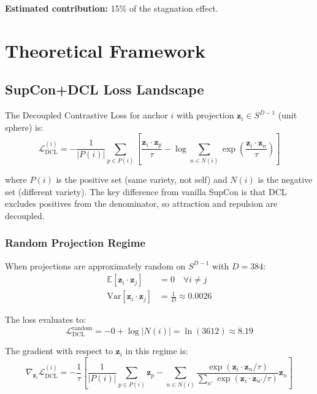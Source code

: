 \documentclass[11pt,a4paper]{article}
\newcommand{\loss}{\mathcal{L}}
\newcommand{\expect}{\mathbb{E}}
\newcommand{\dcl}{\text{DCL}}
\begin{document}
\medskip
\noindent\textbf{Estimated contribution:} 15\% of the stagnation effect.


\section{Theoretical Framework}

\subsection{SupCon+DCL Loss Landscape}

The Decoupled Contrastive Loss for anchor $i$ with projection $\mathbf{z}_i \in S^{D-1}$
(unit sphere) is:
\begin{equation}
\loss_{\dcl}^{(i)} = -\frac{1}{|P(i)|} \sum_{p \in P(i)} \left[
    \frac{\mathbf{z}_i \cdot \mathbf{z}_p}{\tau} - \log \sum_{n \in N(i)} \exp\!\left(\frac{\mathbf{z}_i \cdot \mathbf{z}_n}{\tau}\right)
\right]
\label{eq:dcl}
\end{equation}

where $P(i)$ is the positive set (same variety, not self) and $N(i)$ is the negative
set (different variety). The key difference from vanilla SupCon is that DCL excludes
positives from the denominator, so attraction and repulsion are decoupled.

\subsubsection{Random Projection Regime}

When projections are approximately random on $S^{D-1}$ with $D = 384$:
\begin{align}
\expect[\mathbf{z}_i \cdot \mathbf{z}_j] &= 0 \quad\forall i \neq j \\
\text{Var}[\mathbf{z}_i \cdot \mathbf{z}_j] &= \frac{1}{D} \approx 0.0026
\end{align}

The loss evaluates to:
\begin{equation}
\loss_{\dcl}^{\text{random}} = -0 + \log|N(i)| = \ln(3612) \approx 8.19
\end{equation}

The gradient with respect to $\mathbf{z}_i$ in this regime is:
\begin{equation}
\nabla_{\mathbf{z}_i} \loss_{\dcl}^{(i)} = -\frac{1}{\tau} \left[
    \frac{1}{|P(i)|} \sum_{p \in P(i)} \mathbf{z}_p
    - \sum_{n \in N(i)} \frac{\exp(\mathbf{z}_i \cdot \mathbf{z}_n / \tau)}{\sum_{n'} \exp(\mathbf{z}_i \cdot \mathbf{z}_{n'} / \tau)} \mathbf{z}_n
\right]
\end{equation}
\end{document}
